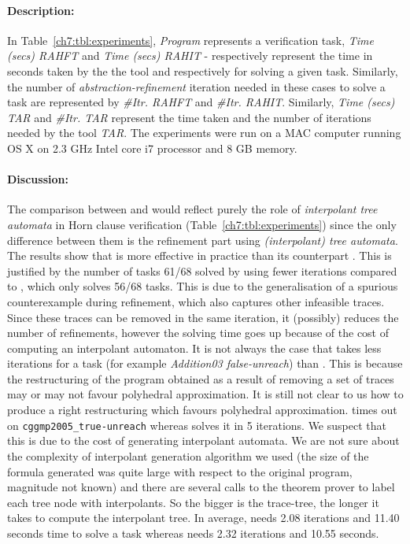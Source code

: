 \paragraph{Description:} In Table~\ref{ch7:tbl:experiments},  {\it Program} represents a verification task, {\it Time (secs) RAHFT} and {\it Time (secs) RAHIT} - respectively represent the time in seconds taken by the the tool   and   respectively for solving a given task. Similarly,  the number of \emph{abstraction-refinement} iteration needed in these cases to solve a task are represented by   {\it \#Itr. RAHFT} and {\it \#Itr. RAHIT}. Similarly, {\it Time (secs) TAR} and {\it \#Itr. TAR} represent the time taken and the number of iterations  needed by the  tool \emph{TAR}. The experiments were run on a MAC computer running  OS X on  2.3 GHz Intel core i7 processor  and 8 GB memory.

\paragraph{Discussion:}
The comparison between  and  would reflect purely the role of \emph{interpolant tree automata} in Horn clause verification (Table~\ref{ch7:tbl:experiments}) since the only difference between them is the refinement part using \emph{(interpolant) tree automata}. 
The results show that  is more effective in practice than its counterpart . This is justified by the  number of tasks 61/68 solved by  using fewer iterations  compared to , which only solves 56/68 tasks.   This is due to the generalisation of a spurious counterexample during refinement, which also captures other infeasible traces. Since these traces  can be removed in the same iteration,  it (possibly) reduces the number of refinements, however the solving time goes up because of the cost of computing an interpolant automaton.  It is not always the case that  takes less iterations for a task (for example  \emph{Addition03 false-unreach}) than . This is because  the  restructuring of the program obtained  as a result of removing a set of traces may  or may not favour   polyhedral approximation. It is still not clear to us how to produce a right  restructuring which favours  polyhedral approximation.   times out on \texttt{cggmp2005\_true-unreach}  whereas   solves it in 5 iterations. We suspect that this is due to the cost of generating  interpolant automata. We are not sure about the complexity of interpolant generation algorithm we used (the size of the formula generated was quite large with respect to the original program, magnitude not known) and there are several calls to the  theorem prover to label each tree node with interpolants.  So the bigger is the trace-tree, the longer it takes to compute the interpolant tree.  In average,    needs 2.08 iterations and 11.40 seconds time to solve a task whereas  needs 2.32 iterations and 10.55 seconds.




